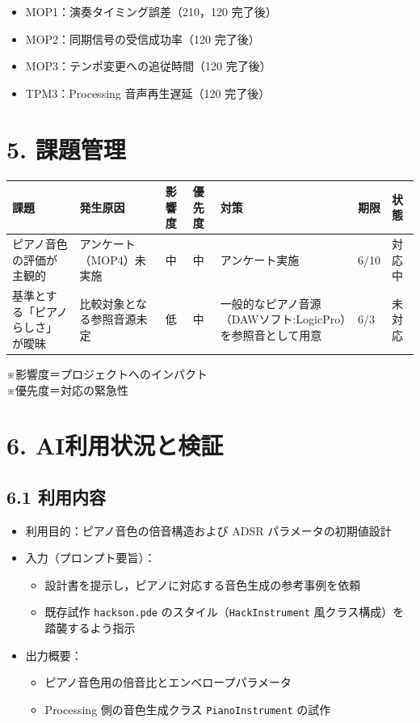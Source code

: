 \documentclass[a4paper,11pt]{ltjsarticle}
\providecommand{\％}{\%}
\begin{document}
\begin{itemize}
    \item MOP1：演奏タイミング誤差（210，120 完了後）
    \item MOP2：同期信号の受信成功率（120 完了後）
    \item MOP3：テンポ変更への追従時間（120 完了後）
    \item TPM3：Processing 音声再生遅延（120 完了後）
\end{itemize}

\section{5. 課題管理}

\begin{longtable}{|p{2.4cm}|p{2.8cm}|p{1cm}|p{1cm}|p{3.2cm}|p{1.8cm}|p{1.8cm}|}
\hline
\rowcolor[gray]{0.9}
課題 & 発生原因 & 影響度 & 優先度 & 対策 & 期限 & 状態 \\
\hline
ピアノ音色の評価が主観的 & アンケート（MOP4）未実施 & 中 & 中 & アンケート実施 & 6/10 & 対応中 \\
\hline
基準とする「ピアノらしさ」が曖昧 & 比較対象となる参照音源未定 & 低 & 中 & 一般的なピアノ音源（DAWソフト:LogicPro）を参照音として用意 & 6/3 & 未対応 \\
\hline

\hline
\end{longtable}

\vspace{0.5em}
※影響度＝プロジェクトへのインパクト\\
※優先度＝対応の緊急性

\section{6. AI利用状況と検証}

\subsection*{6.1 利用内容}

\begin{itemize}
    \item 利用目的：ピアノ音色の倍音構造および ADSR パラメータの初期値設計
    \item 入力（プロンプト要旨）：
    \begin{itemize}
        \item 設計書を提示し，ピアノに対応する音色生成の参考事例を依頼
        \item 既存試作 \texttt{hackson.pde} のスタイル（\texttt{HackInstrument} 風クラス構成）を踏襲するよう指示
    \end{itemize}
    \item 出力概要：
    \begin{itemize}
        \item ピアノ音色用の倍音比とエンベロープパラメータ
        \item Processing 側の音色生成クラス \texttt{PianoInstrument} の試作
    \end{itemize}
\end{itemize}
\end{document}
